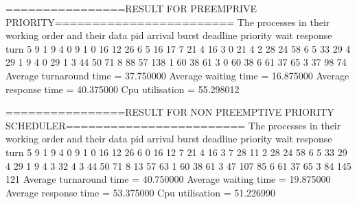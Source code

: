 ================RESULT FOR PREEMPRIVE PRIORITY========================
The processes in their working order and their data
pid      arrival            burst        deadline     priority     wait         response     turn        
5        9                  1            9            4            0            9            1           
0        16                 12           26           6            5            16           17          
7        21                 4            16           3            0            21           4           
2        28                 24           58           6            5            33           29          
4        29                 1            9            4            0            29           1           
3        44                 50           71           8            88           57           138         
1        60                 38           61           3            0            60           38          
6        61                 37           65           3            37           98           74          
Average turnaround time = 37.750000
Average waiting time	= 16.875000
Average response time   = 40.375000
Cpu utilisation     	= 55.298012


================RESULT FOR NON PREEMPTIVE PRIORITY SCHEDULER========================
The processes in their working order and their data
pid      arrival            burst        deadline     priority     wait         response     turn        
5        9                  1            9            4            0            9            1           
0        16                 12           26           6            0            16           12          
7        21                 4            16           3            7            28           11          
2        28                 24           58           6            5            33           29          
4        29                 1            9            4            3            32           4           
3        44                 50           71           8            13           57           63          
1        60                 38           61           3            47           107          85          
6        61                 37           65           3            84           145          121         
Average turnaround time = 40.750000
Average waiting time	= 19.875000
Average response time   = 53.375000
Cpu utilisation     	= 51.226990
